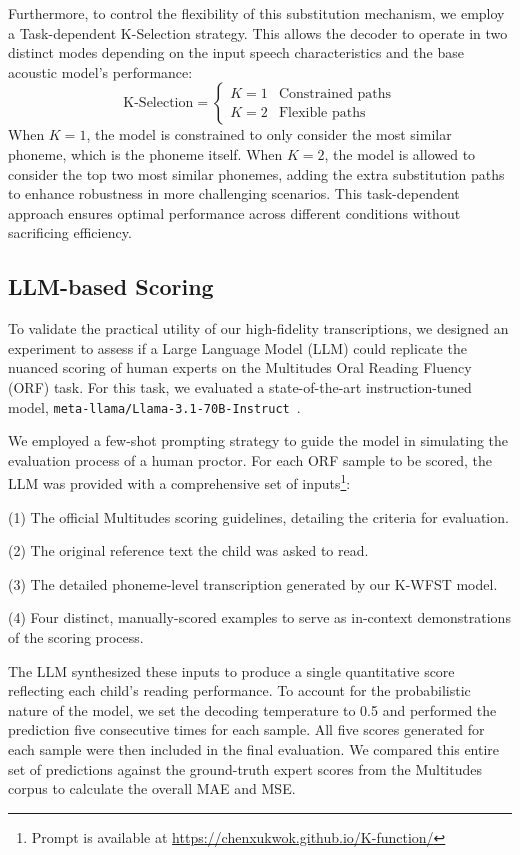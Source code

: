 Furthermore, to control the flexibility of this substitution mechanism, we employ a Task-dependent K-Selection strategy. This allows the decoder to operate in two distinct modes depending on the input speech characteristics and the base acoustic model's performance:
$$
\text{K-Selection} = \left\{
\begin{array}{ll}
    K=1 & \text{Constrained paths} \\
    K=2 & \text{Flexible paths}
\end{array}
\right.
$$
When $K=1$, the model is constrained to only consider the most similar phoneme, which is the phoneme itself. When $K=2$, the model is allowed to consider the top two most similar phonemes, adding the extra substitution paths to enhance robustness in more challenging scenarios. This task-dependent approach ensures optimal performance across different conditions without sacrificing efficiency.



\subsection{LLM-based Scoring}
To validate the practical utility of our high-fidelity transcriptions, we designed an experiment to assess if a Large Language Model (LLM) could replicate the nuanced scoring of human experts on the Multitudes Oral Reading Fluency (ORF) task. For this task, we evaluated a state-of-the-art instruction-tuned model, \texttt{meta-llama/Llama-3.1-70B-Instruct}~\cite{grattafiori2024llama}.

We employed a few-shot prompting strategy to guide the model in simulating the evaluation process of a human proctor. For each ORF sample to be scored, the LLM was provided with a comprehensive set of inputs\footnote{Prompt is available at \url{https://chenxukwok.github.io/K-function/}}: 

(1) The official Multitudes scoring guidelines, detailing the criteria for evaluation.

(2) The original reference text the child was asked to read.

(3) The detailed phoneme-level transcription generated by our K-WFST model.

(4) Four distinct, manually-scored examples to serve as in-context demonstrations of the scoring process.

The LLM synthesized these inputs to produce a single quantitative score reflecting each child’s reading performance. To account for the probabilistic nature of the model, we set the decoding temperature to 0.5 and performed the prediction five consecutive times for each sample. All five scores generated for each sample were then included in the final evaluation. We compared this entire set of predictions against the ground-truth expert scores from the Multitudes corpus to calculate the overall MAE and MSE.
